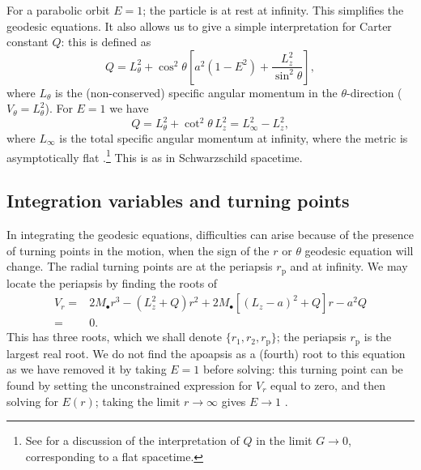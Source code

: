 \documentclass[useAMS,usedcolumn,usegraphicx,usenatbib]{mn2e}
\newcommand{\sub}[1]{\ensuremath{_\mathrm{#1}}}
\begin{document}
For a parabolic orbit $E = 1$; the particle is at rest at infinity. This simplifies the geodesic equations. It also allows us to give a simple interpretation for Carter constant $Q$: this is defined as
\begin{equation}
Q = L_\theta^2 + \cos^2\theta\left[a^2\left(1 - E^2\right) + \frac{L_z^2}{\sin^2\theta}\right],
\end{equation}
where $L_\theta$ is the (non-conserved) specific angular momentum in the $\theta$-direction ($ V_\theta = L_\theta^2$). For $E = 1$ we have
\begin{equation}
Q = L_\theta^2 + \cot^2\theta\, L_z^2 = L_\infty^2 - L_z^2,
\end{equation}
where $L_\infty$ is the total specific angular momentum at infinity, where the metric is asymptotically flat \citep{DeFelice1980}.\footnote{See \citet{Rosquist2009} for a discussion of the interpretation of $Q$ in the limit $G \rightarrow 0$, corresponding to a flat spacetime.} This is as in Schwarzschild spacetime.

\subsection{Integration variables and turning points}

In integrating the geodesic equations, difficulties can arise because of the presence of turning points in the motion, when the sign of the $r$ or $\theta$ geodesic equation will change. The radial turning points are at the periapsis $r\sub{p}$ and at infinity. We may locate the periapsis by finding the roots of
\begin{align}
V_r = {} & 2M_\bullet r^3 - \left(L_z^2+Q\right)r^2 + 2M_\bullet\left[\left(L_z - a\right)^2 + Q\right]r - a^2 Q \nonumber \\
 = {} & 0.
\end{align}
This has three roots, which we shall denote $\{r_1, r_2, r\sub{p}\}$; the periapsis $r\sub{p}$ is the largest real root. We do not find the apoapsis as a (fourth) root to this equation as we have removed it by taking $E = 1$ before solving: this turning point can be found by setting the unconstrained expression for $V_r$ equal to zero, and then solving for $E(r)$; taking the limit $r \rightarrow \infty$ gives $E \rightarrow 1$ \citep{Wilkins1972}.
\end{document}
